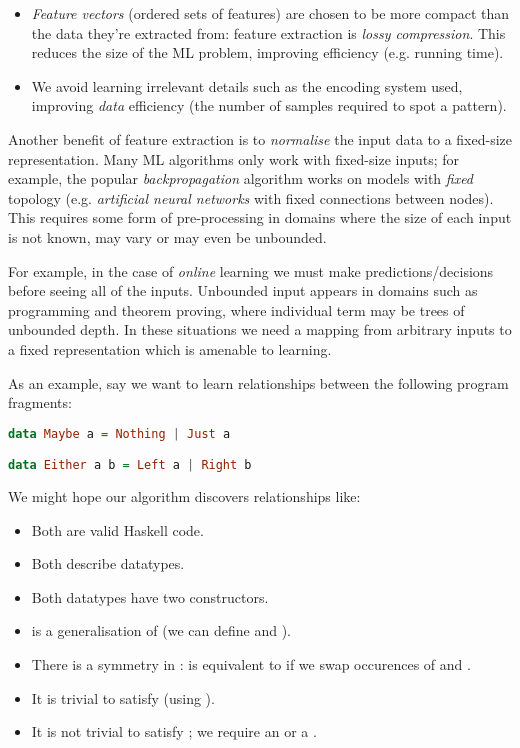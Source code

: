\documentclass[]{article}
\begin{document}
\begin{itemize}
  \item \emph{Feature vectors} (ordered sets of features) are chosen to be more compact than the data they're extracted from: feature extraction is \emph{lossy compression}. This reduces the size of the ML problem, improving efficiency (e.g. running time).
  \item We avoid learning irrelevant details such as the encoding system used, improving \emph{data} efficiency (the number of samples required to spot a pattern).
\end{itemize}

Another benefit of feature extraction is to \emph{normalise} the input data to a fixed-size representation. Many ML algorithms only work with fixed-size inputs; for example, the popular \emph{backpropagation} \cite{Russell:2003:AIM:773294} algorithm works on models with \emph{fixed} topology (e.g. \emph{artificial neural networks} with fixed connections between nodes). This requires some form of pre-processing in domains where the size of each input is not known, may vary or may even be unbounded.

For example, in the case of \emph{online} learning we must make predictions/decisions before seeing all of the inputs. Unbounded input appears in domains such as programming and theorem proving, where individual term may be trees of unbounded depth. In these situations we need a mapping from arbitrary inputs to a fixed representation which is amenable to learning.

As an example, say we want to learn relationships between the following program fragments:

\begin{lstlisting}[language=Haskell, xleftmargin=.2\textwidth, xrightmargin=.2\textwidth]
data Maybe a = Nothing | Just a

data Either a b = Left a | Right b
\end{lstlisting}

We might hope our algorithm discovers relationships like:

\begin{itemize}
  \item Both are valid Haskell code.
  \item Both describe datatypes.
  \item Both datatypes have two constructors.
  \item {} is a generalisation of  (we can define  and ).
  \item There is a symmetry in :  is equivalent to  if we swap occurences of  and .
  \item It is trivial to satisfy  (using ).
  \item It is not trivial to satisfy ; we require an  or a .
\end{itemize}
\end{document}
